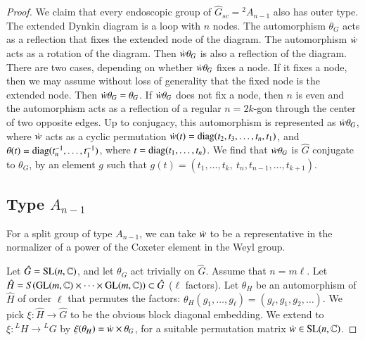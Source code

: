 \begin{proof}
We claim that every endoscopic group of $\hat G_{sc} = {}^2 A_{n-1}$ also has outer type.
The extended Dynkin diagram is a loop with $n$ nodes.  The automorphism $\theta_G$ acts as a reflection that fixes
the extended node of the diagram.  The automorphism $\dot w $ acts as a rotation of the diagram.  Then $\dot w \theta_G$ is also
a reflection of the diagram.  There are two cases, depending on whether $\dot w \theta_G$  fixes a node.  If it fixes a node,
then we may assume without loss of generality that the fixed node is the extended node.  Then $\dot w \theta_G = \theta_G$.
If $\dot w \theta_G$ does not fix a node, then $n$ is even and the automorphism acts as a reflection of a regular $n=2k$-gon
through the center of two opposite edges.  Up to conjugacy, this automorphism is represented as $\dot w \theta_G$, where
$\dot w $ acts as a cyclic permutation $\dot w (t) = {\operatorname{diag}}(t_2,t_3,\ldots,t_n,t_1)$, and $\theta(t) = {\operatorname{diag}}(t_n^{-1},\ldots,t_1^{-1})$,
where $t={\operatorname{diag}}(t_1,\ldots,t_n)$.  We find that $\dot w \theta_G$ is $\hat G$ conjugate to $\theta_G$,
by an element $g$ such that $g(t) = (t_1,\ldots,t_k,\ t_n,t_{n-1},\ldots,t_{k+1})$.



\subsection{Type $A_{n-1}$}



For a split group of type $A_{n-1}$, we can take $\dot w$ to be a representative in the normalizer of a power of the Coxeter element in the Weyl group.

Let $\hat G = {\operatorname{SL}}(n,\mathbb{C})$, and let $\theta_G$ act trivially on $\hat G$.
Assume that $n=m \ell$. 
Let $\hat H = S({\operatorname{GL}}(m,\mathbb{C})\times \cdots\times {\operatorname{GL}}(m,\mathbb{C}))\subset \hat G$ ($\ell$ factors).
Let $\theta_H$ be an automorphism of $\hat H$ of order $\ell$ that permutes the factors:
$\theta_H(g_1,\ldots,g_\ell) = (g_\ell,g_1,g_2,\ldots)$.
We pick $\xi:\hat H\to \hat G$ to be the obvious block diagonal embedding.  We extend
to $\xi:{}^LH\to {}^LG$ by  $\xi(\theta_H) = \dot w \times \theta_G$, for a suitable permutation
matrix $\dot w \in {\operatorname{SL}}(n,\mathbb{C})$. 


\end{proof}
